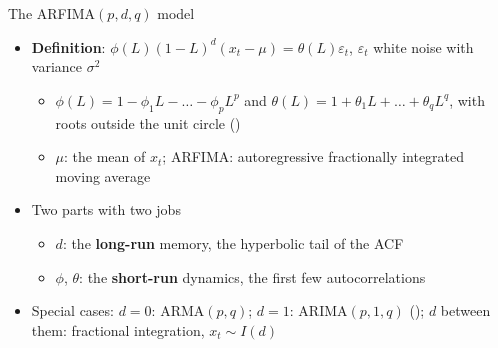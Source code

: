 \begin{frame}{The ARFIMA$(p,d,q)$ model}
\itemsize{\small}
\begin{itemize}
    \item \textbf{Definition}: $\phi(L)(1-L)^d(x_t - \mu) = \theta(L)\varepsilon_t$, $\varepsilon_t$ white noise with variance $\sigma^2$
    \begin{itemize}
        \item $\phi(L) = 1 - \phi_1L - \dots - \phi_pL^p$ and $\theta(L) = 1 + \theta_1L + \dots + \theta_qL^q$, with roots outside the unit circle ()
        \item $\mu$: the mean of $x_t$; ARFIMA: autoregressive fractionally integrated moving average
    \end{itemize}
    \item Two parts with two jobs
    \begin{itemize}
        \item $d$: the \textbf{long-run} memory, the hyperbolic tail of the ACF
        \item $\phi$, $\theta$: the \textbf{short-run} dynamics, the first few autocorrelations
    \end{itemize}
    \item Special cases: $d = 0$: ARMA$(p,q)$; $d = 1$: ARIMA$(p,1,q)$ (); $d$ between them: fractional integration, $x_t \sim I(d)$
\end{itemize}
\end{frame}

